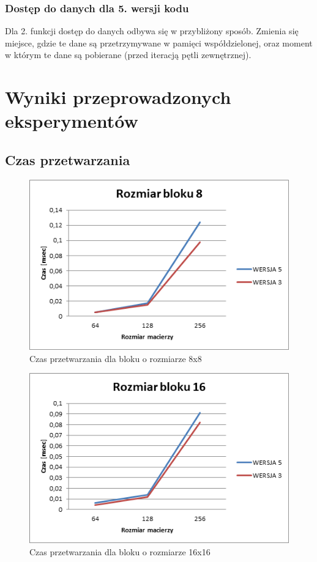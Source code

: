 \documentclass{article}
\begin{document}
\subsubsection{Dostęp do danych dla 5. wersji kodu}

Dla 2. funkcji dostęp do danych odbywa się w przybliżony sposób. Zmienia się miejsce, gdzie te dane są przetrzymywane w pamięci współdzielonej, oraz moment w którym te dane są pobierane (przed iteracją pętli zewnętrznej).

\section{Wyniki przeprowadzonych eksperymentów}

\subsection{Czas przetwarzania}

\begin{figure}[H]
	\centering
	\includegraphics[width=\linewidth]{./images/graphs/time/graph1.png}
	\caption{Czas przetwarzania dla bloku o rozmiarze 8x8}
	\label{fig:grapht1}
\end{figure}

\begin{figure}[H]
	\centering
	\includegraphics[width=\linewidth]{./images/graphs/time/graph2.png}
	\caption{Czas przetwarzania dla bloku o rozmiarze 16x16}
	\label{fig:grapht2}
\end{figure}
\end{document}
